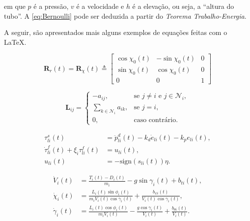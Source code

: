 \noindent em que $p$ é a pressão, $v$ é a velocidade e $h$ é a elevação, ou seja, a ``altura do tubo''. A \cref{eq:Bernoulli} pode ser deduzida a partir do \textit{Teorema Trabalho-Energia}.


A seguir, são apresentados mais alguns exemplos de equações feitas com o \LaTeX.

\newcommand{\vt}[1]{\mathbf{#1}}

\begin{equation}\label{eq:R_f_usual}
\vt{R}_r(t) = \vt{R}_{\chi}(t) \triangleq 
\begin{bmatrix}
\cos \chi_0 (t) & -\sin \chi_0 (t) & 0
\\
\sin \chi_0 (t) & \cos \chi_0 (t) & 0
\\
0 & 0 & 1
\end{bmatrix}
\end{equation}

\begin{equation}
\vt{L}_{ij} = 
\begin{cases}
-a_{ij}, & \text{se } j \neq i \text{ e } j \in \mathcal{N}_i, \\
\sum_{k \in \mathcal{N}_i} a_{ik}, & \text{se } j = i,  \\
0, & \text{caso contrário}.
\end{cases}
\end{equation}

\begin{align}
\tau_{li}^s(t) &= \ddot{p}^d_{li}(t) - k_{d} \dot{e}_{li}(t) - k_{p} e_{li}(t),
\\
\dot{\tau}_{li}^f(t) +  \xi_{i} \tau_{li}^f(t) &= u_{li}(t),\label{eq:filtro_i}
\\
u_{li}(t) &= - \textrm{sign}(s_{li}(t))\eta. \label{eq:u_xbi}
\end{align}

\begin{equation}\label{eq:point-mass-velocity}
\begin{split}
\dot{V}_i(t) &{}= \frac{T_i(t) - D_i(t)}{m_i} - g \sin \gamma_i(t) + b_{ti}(t), \\
\dot{\chi}_i(t) &{}= \frac{L_i(t) \sin \phi_i(t)}{m_i V_i(t) \cos \gamma_i(t)} + \frac{b_{\psi i}(t)}{V_i(t)\cos \gamma_i(t)},\\
\dot{\gamma}_i(t) &{}= \frac{L_i(t) \cos \phi_i(t)}{m_i V_i(t)} - \frac{g \cos \gamma_i(t)}{V_i(t)} + \frac{b_{\theta i}(t)}{V_i(t)}.
\end{split}
\end{equation}

